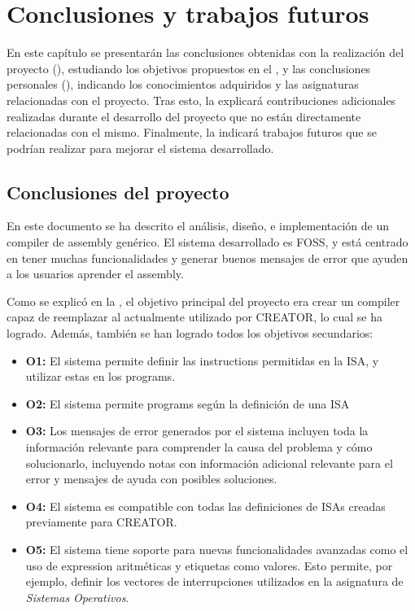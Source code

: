 \chapter{Conclusiones y trabajos futuros}\label{chap:conclusions}

En este capítulo se presentarán las conclusiones obtenidas con la realización
del proyecto (), estudiando los objetivos
propuestos en el , y las conclusiones personales
(), indicando los conocimientos adquiridos y
las asignaturas relacionadas con el proyecto. Tras esto, la
 explicará contribuciones adicionales
realizadas durante el desarrollo del proyecto que no están directamente
relacionadas con el mismo. Finalmente, la  indicará
trabajos futuros que se podrían realizar para mejorar el sistema desarrollado.

\section{Conclusiones del proyecto}\label{sec:proyect-conclusions}

En este documento se ha descrito el análisis, diseño, e implementación de un
\gls{compiler} de \gls{assembly} genérico. El sistema desarrollado es
\gls{FOSS}, y está centrado en tener muchas funcionalidades y generar buenos
mensajes de error que ayuden a los usuarios aprender el \gls{assembly}.

Como se explicó en la , el objetivo principal del
proyecto era crear un \gls{compiler} capaz de reemplazar al actualmente
utilizado por CREATOR, lo cual se ha logrado. Además, también se han logrado
todos los objetivos secundarios:

\begin{itemize}
    \item \textbf{O1:} El sistema permite definir las \glspl{instruction}
    permitidas en la \gls{ISA}, y utilizar estas en los \glspl{program}.
    \item \textbf{O2:} El sistema permite 
    \glspl{program} según la definición de una \gls{ISA}
    \item \textbf{O3:} Los mensajes de error generados por el sistema incluyen
    toda la información relevante para comprender la causa del problema y cómo
    solucionarlo, incluyendo notas con información adicional relevante para el
    error y mensajes de ayuda con posibles soluciones.
    \item \textbf{O4:} El sistema es compatible con todas las definiciones de
    \glspl{ISA} creadas previamente para CREATOR.
    \item \textbf{O5:} El sistema tiene soporte para nuevas funcionalidades
    avanzadas como el uso de \gls{expression} aritméticas y etiquetas como
    valores. Esto permite, por ejemplo, definir los vectores de interrupciones
    utilizados en la asignatura de \textit{Sistemas Operativos}.
\end{itemize}

